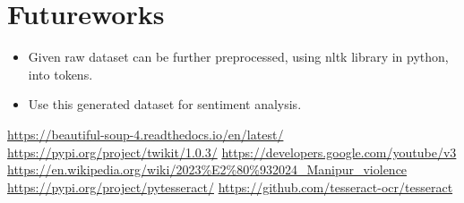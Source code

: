 \documentclass{report}
\begin{document}
\newpage
\vspace*{3pt}
\section{Futureworks}
\begin{itemize}
    \item Given raw dataset can be further preprocessed, using nltk library in python, into tokens.
    \item Use this generated dataset for sentiment analysis.
\end{itemize}










\vspace*{3pt}
\begin{thebibliography}{6}
 \url{https://beautiful-soup-4.readthedocs.io/en/latest/}
 \url{https://pypi.org/project/twikit/1.0.3/}
 \url{https://developers.google.com/youtube/v3}
 \url{https://en.wikipedia.org/wiki/2023%E2%80%932024_Manipur_violence}
 \url{https://pypi.org/project/pytesseract/}
 \url{https://github.com/tesseract-ocr/tesseract}
\end{thebibliography}
\end{document}
